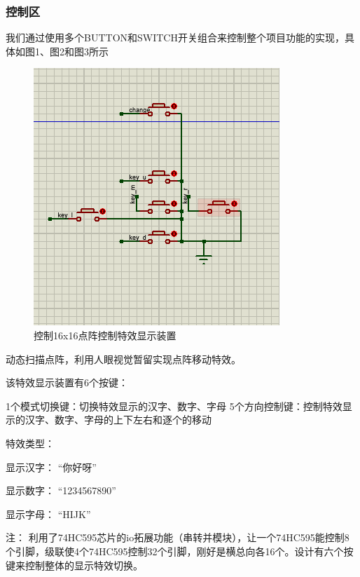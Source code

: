 \documentclass{textreportclass}  %
\begin{document}
	
	\subsubsection{控制区}
	我们通过使用多个BUTTON和SWITCH开关组合来控制整个项目功能的实现，具体如图1、图2和图3所示
	
	
	\begin{figure}[htbp]
		\centering
		\includegraphics[scale=0.4]{Fig/控制区一.png}
		\caption{控制16x16点阵控制特效显示装置}\label{Fig.36}
	\end{figure}
	
	动态扫描点阵，利用人眼视觉暂留实现点阵移动特效。
	
	该特效显示装置有6个按键：
	
	1个模式切换键：切换特效显示的汉字、数字、字母
	5个方向控制键：控制特效显示的汉字、数字、字母的上下左右和逐个的移动
	
	特效类型：
	
	显示汉字： “你好呀”
	
	显示数字： “1234567890”
	
	显示字母： “HIJK”
	
	注：
	利用了74HC595芯片的io拓展功能（串转并模块），让一个74HC595能控制8个引脚，级联使4个74HC595控制32个引脚，刚好是横总向各16个。设计有六个按键来控制整体的显示特效切换。
	
\end{document}
